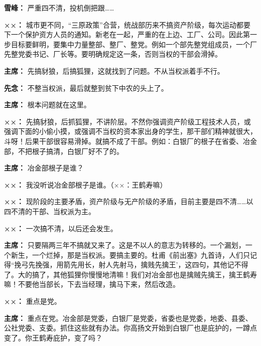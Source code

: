 \begin{list}{}
\item[\textbf{雪峰：}] 严重四不清，投机倒把跟……

\item[\textbf{××：}] 城市更不同，“三原政策”合营，统战部历来不搞资产阶级，每次运动都要下一个保护资方人员的通知。新老在一起，严重的在上边、工厂、公司。因此第一步目标要鲜明，要集中力量整部、整厂、整党。例如一个部先整党组成员，一个厂先整党委书记、厂长等。要明确规定这一条，否则当权的干部会滑掉。

\item[\textbf{主席：}] 先搞豺狼，后搞狐狸，这就找到了问题。不从当权派着手不行。

\item[\textbf{先念：}] 不整当权派，最后就整到贫下中农的头上了。

\item[\textbf{主席：}] 根本问题就在这里。

\item[\textbf{××：}] 先搞豺狼，后抓狐狸，不讲阶层。不然你强调资产阶级工程技术人员，或强调下面的小偷小摸，或强调不当权的资本家出身的学生，那干部们精神就很大，斗呀！后果干部很容易滑掉。就搞不成了干部。例如：白银厂的根子在省委、冶金部，不把根子搞清，白银厂好不了的。

\item[\textbf{主席：}] 冶金部根子是谁？

\item[\textbf{××：}] 我没听说冶金部根子是谁。（××：王鹤寿嘛）

\item[\textbf{××：}] 现阶段的主要矛盾，资产阶级与无产阶级的矛盾，目前主要是四不清……以四不清的干部、当权派为主。

\item[\textbf{××：}] 一次搞不清，以后还会发生。

\item[\textbf{主席：}] 只要隔两三年不搞就又来了。这是不以人的意志为转移的。一个漏划，一个新生，一个烂掉，那是当权派。要搞主要的。杜甫《前出塞》九首诗，人们只记得“挽弓先挽强，用箭先用长，射人先射马，擒贱先擒王’，这四句，其他记不得了。大的搞了，其他狐狸你慢慢地清嘛！我们对冶金部也是擒贼先擒王，擒王鹤寿嘛！不要他当部长，下去当经理，擒马下来，然后改造。

\item[\textbf{××：}] 重点是党。

\item[\textbf{主席：}] 重点在党。冶金部是党委，白银厂是党委，省委也是党委，地委、县委、公社党委、支委。抓住这些就有办法。你高扬文开始到白银厂也是庇护的，一蹲点变了。你王鹤寿庇护，变了吗？


\end{list}
